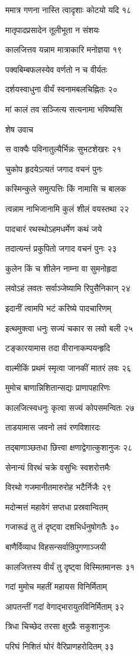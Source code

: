 ममात्र गणना नास्ति त्वादृशाः कोटयो यदि १८

मातृपादप्रसादेन तूलीभूता न संशयः

कालजित्तव यन्नाम मात्राकारि मनोज्ञया १९

पक्वबिम्बफलस्येव वर्णतो न च वीर्यतः

दर्शयस्वाधुना वीर्यं स्वनामबलचिह्नितः २०

मां कालं तव सञ्जित्य सत्यनामा भविष्यसि

शेष उवाच

स वाक्यैः पविनातुल्यैर्भिन्नः सुभटशेखरः २१

चुकोप हृदयेऽत्यतं जगाद वचनं पुनः

कस्मिन्कुले समुत्पत्तिः किं नामासि च बालक

त्वन्नाम नाभिजानामि कुलं शीलं वयस्तथा २२

पादचारं रथस्थोऽहमधर्मेण कथं जये

तदात्यन्तं प्रकुपितो जगाद वचनं पुनः २३

कुलेन किं च शीलेन नाम्ना वा सुमनोहृदा

लवोऽहं लवतः सर्वाञ्जेष्यामि रिपुसैनिकान् २४

इदानीं त्वामपि भटं करिष्ये पादचारिणम्

इत्थमुक्त्वा धनुः सज्यं चकार स लवो बली २५

टङ्कारयामास तदा वीरानाकम्पयन्हृदि

वाल्मीकिं प्रथमं स्मृत्वा जानकीं मातरं लवः २६

मुमोच बाणान्निशितान्सद्यः प्राणापहारिणः

कालजित्स्वधनुः कृत्वा सज्यं कोपसमन्वितः २७

ताडयामास जवनो लवं रणविशारदः

तद्बाणाञ्छतधा छित्त्वा क्षणाद्वेगात्कुशानुजः २८

सेनान्यं विरथं चक्रे वसुभिः स्वशरोत्तमैः

विरथो गजमानीतमारुरोह भटैर्निजैः २९

मदोन्मत्तं महावेगं सप्तधा प्रस्रवान्वितम्

गजारूढं तु तं दृष्ट्वा दशभिर्धनुषोगतैः ३०

बाणैर्विव्याध विहसन्सर्वान्रिपुगणाञ्जयी

कालजित्तस्य वीर्यं तु दृष्ट्वा विस्मितमानसः ३१

गदां मुमोच महतीं महायस विनिर्मिताम्

आपतन्तीं गदां वेगाद्भारायुतविनिर्मिताम् ३२

त्रिधा चिच्छेद तरसा क्षुरप्रैः सकुशानुजः

परिघं निशितं घोरं वैरिप्राणहरोदितम् ३३

